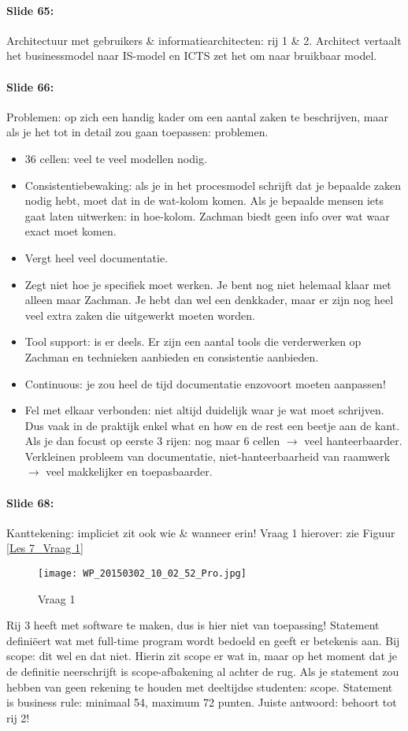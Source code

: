 \documentclass[10pt,a4paper]{report}
\begin{document}
\paragraph{Slide 65:}Architectuur met gebruikers \& informatiearchitecten: rij 1 \& 2. Architect vertaalt het businessmodel naar IS-model en ICTS zet het om naar bruikbaar model.

\paragraph{Slide 66:}Problemen: op zich een handig kader om een aantal zaken te beschrijven, maar als je het tot in detail zou gaan toepassen: problemen.
\begin{itemize}
\item 36 cellen: veel te veel modellen nodig.
\item Consistentiebewaking: als je in het procesmodel schrijft dat je bepaalde zaken nodig hebt, moet dat in de wat-kolom komen. Als je bepaalde mensen iets gaat laten uitwerken: in hoe-kolom. Zachman biedt geen info over wat waar exact moet komen. 
\item Vergt heel veel documentatie.
\item Zegt niet hoe je specifiek moet werken. Je bent nog niet helemaal klaar met alleen maar Zachman. Je hebt dan wel een denkkader, maar er zijn nog heel veel extra zaken die uitgewerkt moeten worden.
\item Tool support: is er deels. Er zijn een aantal tools die verderwerken op Zachman en technieken aanbieden en consistentie aanbieden.
\item Continuous: je zou heel de tijd documentatie enzovoort moeten aanpassen!
\item Fel met elkaar verbonden: niet altijd duidelijk waar je wat moet schrijven. Dus vaak in de praktijk enkel what en how en de rest een beetje aan de kant. Als je dan focust op eerste 3 rijen: nog maar 6 cellen $\rightarrow$ veel hanteerbaarder. Verkleinen probleem van documentatie, niet-hanteerbaarheid van raamwerk $\rightarrow$ veel makkelijker en toepasbaarder.
\end{itemize}
	
\paragraph{Slide 68:}Kanttekening: impliciet zit ook wie \& wanneer erin!
Vraag 1 hierover: zie Figuur \ref{Les 7_Vraag 1}
\begin{figure}[ht!]
\centering
\texttt{[image: WP\_20150302\_10\_02\_52\_Pro.jpg]}
\caption{Vraag 1 \label{Les7_Vraag 1}}
\end{figure}
Rij 3 heeft met software te maken, dus is hier niet van toepassing!
Statement definiëert wat met full-time program wordt bedoeld en geeft er betekenis aan. Bij scope: dit wel en dat niet. Hierin zit scope er wat in, maar op het moment dat je de definitie neerschrijft is scope-afbakening al achter de rug. Als je statement zou hebben van geen rekening te houden met deeltijdse studenten: scope. Statement is business rule: minimaal 54, maximum 72 punten. Juiste antwoord: behoort tot rij 2!\\
\end{document}
